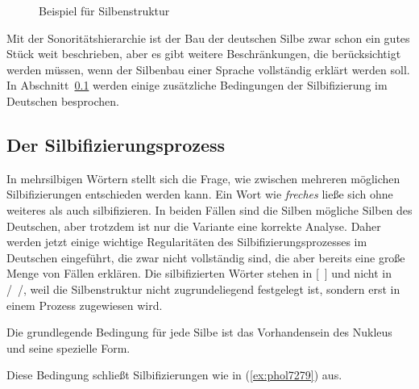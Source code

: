 \begin{figure}[!h]
  \centering
  \caption{Beispiel für Silbenstruktur}
  \label{fig:phonstr}
\end{figure}

Mit der Sonoritätshierarchie ist der Bau der deutschen Silbe zwar schon ein gutes Stück weit beschrieben, aber es gibt weitere Beschränkungen, die berücksichtigt werden müssen, wenn der Silbenbau einer Sprache vollständig erklärt werden soll.
In Abschnitt~\ref{sec:silbifizierung} werden einige zusätzliche Bedingungen der Silbifizierung im Deutschen besprochen.

\subsection{Der Silbifizierungsprozess}

\label{sec:silbifizierung}

In mehrsilbigen Wörtern stellt sich die Frage, wie zwischen mehreren möglichen Silbifizierungen entschieden werden kann.
Ein Wort wie \textit{freches} ließe sich ohne weiteres \textipa{[fKE.\c{c}@s]} als auch \textipa{[fKE\c{c}.@s]} silbifizieren.
In beiden Fällen sind die Silben mögliche Silben des Deutschen, aber trotzdem ist nur die Variante \textipa{[fKE.\c{c}@s]} eine korrekte Analyse.
Daher werden jetzt einige wichtige Regularitäten des Silbifizierungsprozesses im Deutschen eingeführt, die zwar nicht vollständig sind, die aber bereits eine große Menge von Fällen erklären.
Die silbifizierten Wörter stehen in [~] und nicht in /~/, weil die Silbenstruktur nicht zugrundeliegend festgelegt ist, sondern erst in einem Prozess zugewiesen wird.

Die grundlegende Bedingung für jede Silbe ist das Vorhandensein des Nukleus und seine spezielle Form.


Diese Bedingung schließt Silbifizierungen wie in (\ref{ex:phol7279}) aus.

